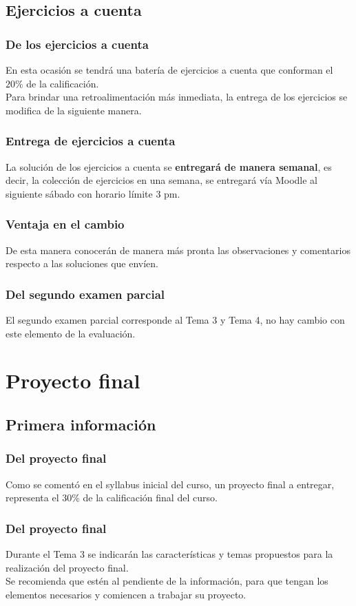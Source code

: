 \documentclass[12pt]{beamer}
\begin{document}
\subsection{Ejercicios a cuenta}

\begin{frame}
\frametitle{De los ejercicios a cuenta}
En esta ocasión se tendrá una batería de ejercicios a cuenta que conforman el $20 \%$ de la calificación.
\\
\bigskip
\pause
Para brindar una retroalimentación más inmediata, la entrega de los ejercicios se modifica de la siguiente manera.
\end{frame}
\begin{frame}
\frametitle{Entrega de ejercicios a cuenta}
La solución de los ejercicios a cuenta se \textbf{\textcolor{auburn}{entregará de manera semanal}}, \pause es decir, \pause la colección de ejercicios en una semana, se entregará vía Moodle al siguiente sábado con horario límite 3 pm.
\end{frame}
\begin{frame}
\frametitle{Ventaja en el cambio}
De esta manera conocerán de manera más pronta las observaciones y comentarios respecto a las soluciones que envíen.
\end{frame}
\begin{frame}
\frametitle{Del segundo examen parcial}
El segundo examen parcial corresponde al Tema 3 y Tema 4, no hay cambio con este elemento de la evaluación.
\end{frame}

\section{Proyecto final}
\subsection{Primera información}

\begin{frame}
\frametitle{Del proyecto final}
Como se comentó en el syllabus inicial del curso, \pause un proyecto final a entregar, representa el $30 \%$ de la calificación final del curso.
\end{frame}
\begin{frame}
\frametitle{Del proyecto final}
Durante el Tema 3 se indicarán las características y temas propuestos para la realización del proyecto final.
\\
\bigskip
\pause
Se recomienda que estén al pendiente de la información, para que tengan los elementos necesarios y comiencen a trabajar su proyecto.
\end{frame}
\end{document}
